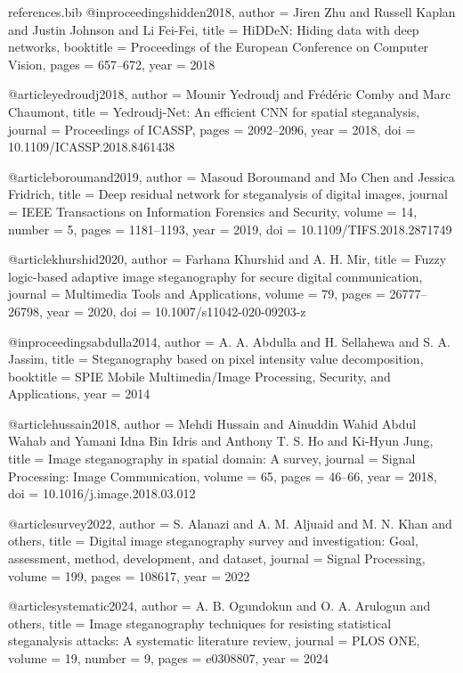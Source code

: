 \begin{filecontents*}{references.bib}
@inproceedings{hidden2018,
  author    = {Jiren Zhu and Russell Kaplan and Justin Johnson and Li Fei-Fei},
  title     = {{HiDDeN}: Hiding data with deep networks},
  booktitle = {Proceedings of the European Conference on Computer Vision},
  pages     = {657--672},
  year      = {2018}
}

@article{yedroudj2018,
  author    = {Mounir Yedroudj and Fr{\'e}d{\'e}ric Comby and Marc Chaumont},
  title     = {{Yedroudj-Net}: An efficient {CNN} for spatial steganalysis},
  journal   = {Proceedings of ICASSP},
  pages     = {2092--2096},
  year      = {2018},
  doi       = {10.1109/ICASSP.2018.8461438}
}

@article{boroumand2019,
  author    = {Masoud Boroumand and Mo Chen and Jessica Fridrich},
  title     = {Deep residual network for steganalysis of digital images},
  journal   = {IEEE Transactions on Information Forensics and Security},
  volume    = {14},
  number    = {5},
  pages     = {1181--1193},
  year      = {2019},
  doi       = {10.1109/TIFS.2018.2871749}
}

@article{khurshid2020,
  author    = {Farhana Khurshid and A. H. Mir},
  title     = {Fuzzy logic-based adaptive image steganography for secure digital communication},
  journal   = {Multimedia Tools and Applications},
  volume    = {79},
  pages     = {26777--26798},
  year      = {2020},
  doi       = {10.1007/s11042-020-09203-z}
}

@inproceedings{abdulla2014,
  author    = {A. A. Abdulla and H. Sellahewa and S. A. Jassim},
  title     = {Steganography based on pixel intensity value decomposition},
  booktitle = {SPIE Mobile Multimedia/Image Processing, Security, and Applications},
  year      = {2014}
}

@article{hussain2018,
  author    = {Mehdi Hussain and Ainuddin Wahid Abdul Wahab and Yamani Idna Bin Idris and Anthony T. S. Ho and Ki-Hyun Jung},
  title     = {Image steganography in spatial domain: A survey},
  journal   = {Signal Processing: Image Communication},
  volume    = {65},
  pages     = {46--66},
  year      = {2018},
  doi       = {10.1016/j.image.2018.03.012}
}

@article{survey2022,
  author    = {S. Alanazi and A. M. Aljuaid and M. N. Khan and others},
  title     = {Digital image steganography survey and investigation: Goal, assessment, method, development, and dataset},
  journal   = {Signal Processing},
  volume    = {199},
  pages     = {108617},
  year      = {2022}
}

@article{systematic2024,
  author    = {A. B. Ogundokun and O. A. Arulogun and others},
  title     = {Image steganography techniques for resisting statistical steganalysis attacks: A systematic literature review},
  journal   = {PLOS ONE},
  volume    = {19},
  number    = {9},
  pages     = {e0308807},
  year      = {2024}
}


\end{filecontents*}
